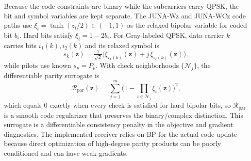 \documentclass[journal]{IEEEtran}
\newcommand{\junawz}{JUNA-Wz}
\newcommand{\junawcz}{JUNA-WCz}
\begin{document}
Because the code constraints are binary while the subcarriers carry QPSK, the bit
and symbol variables are kept separate. The \junawz{} and \junawcz{} code paths
use $\xi_i=\tanh(z_i/2)\in(-1,1)$ as the relaxed bipolar variable for coded bit
$b_i$. Hard bits satisfy $\xi_i=1-2b_i$. For Gray-labeled QPSK, data carrier $k$ carries bits
$i_1(k),i_2(k)$ and its relaxed symbol is
\begin{equation}
  s_k(\mathbf z)=\tfrac{1}{\sqrt2}\big(\xi_{i_1(k)}(\mathbf z)
  +j\,\xi_{i_2(k)}(\mathbf z)\big),
  \label{eq:qpsk-soft}
\end{equation}
while pilots use known $s_p=P_p$. With check neighborhoods $\{\mathcal N_j\}$,
the differentiable parity surrogate is
\begin{equation}
  \mathcal R_{\mathrm{par}}(\mathbf z)
  =\sum_{j=1}^{m}\Big(1-\prod_{i\in\mathcal N_j}\xi_i(\mathbf z)\Big)^2 ,
  \label{eq:soft-parity}
\end{equation}
which equals $0$ exactly when every check is satisfied for hard bipolar bits, so
$\mathcal R_{\mathrm{par}}$ is a smooth code regularizer that preserves the
binary/complex distinction.
This surrogate is a differentiable consistency penalty in the objective and
gradient diagnostics. The implemented receiver relies on BP for the actual code
update because direct optimization of high-degree parity products can be poorly
conditioned and can have weak gradients.
\end{document}
